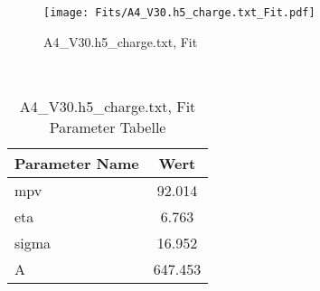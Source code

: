 \begin{figure}[ht] 
 	\centering 
 	\texttt{[image: Fits/A4\_V30.h5\_charge.txt\_Fit.pdf]} 
	\caption{A4_V30.h5_charge.txt, Fit} 
 	\label{fig:A4_V30.h5_charge.txt, Fit} 
\end{figure}
 \\ 
\begin{table}[ht] 
\centering 
\caption{A4_V30.h5_charge.txt, Fit Parameter Tabelle} 
\label{tab:my-table}
\begin{tabular}{|l|c|}
\hline
Parameter Name	&	Wert \\ \hline
mpv	&	 92.014\\ \hline
eta	&	 6.763\\ \hline
sigma	&	 16.952\\ \hline
A	&	 647.453\\ \hline
\end{tabular} 
\end{table}